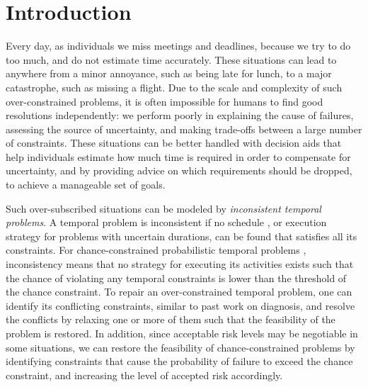 \documentclass[jair,twoside,11pt,theapa]{article}
\begin{document}
\section{Introduction}

Every day, as individuals we miss meetings and deadlines, because we try to do
too much, and do not estimate time accurately. These situations can lead to
anywhere from a minor annoyance, such as being late for lunch, to a major
catastrophe, such as missing a flight. Due to the scale and
complexity of such over-constrained problems, it is often impossible for humans
to find good resolutions independently: we perform poorly in explaining the
cause of failures, assessing the source of uncertainty, and making trade-offs
between a large number of constraints. These situations can be better handled
with decision aids that help individuals estimate how much time is required
in order to compensate for uncertainty, and by providing advice on which
requirements should be dropped, to achieve a manageable set of goals.


Such over-subscribed situations can be modeled by \textit{inconsistent temporal
problems}. A temporal problem is inconsistent if no schedule
\cite{Dechter_TCN_1991}, or execution strategy \cite{Vidal99handlingcontingency}
for problems with uncertain durations, can be found that satisfies all its
constraints. For chance-constrained probabilistic temporal problems
\cite{Fang_AAAI_2014}, inconsistency means that no strategy for executing its
activities exists such that the chance of violating any temporal constraints is
lower than the threshold of the chance constraint. To repair an over-constrained temporal
problem, one can identify its conflicting constraints, similar to past work on
diagnosis, and resolve the conflicts by relaxing one or more of them such that
the feasibility of the problem is restored. In addition, since acceptable
risk levels may be negotiable in some situations, we can restore the feasibility
of chance-constrained problems by identifying constraints that cause the
probability of failure to exceed the chance constraint, and increasing the level
of accepted risk accordingly.
\end{document}
